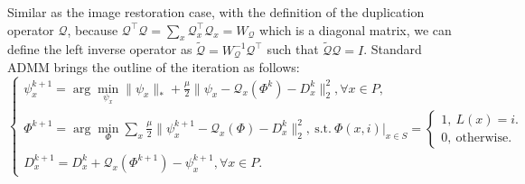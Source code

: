 \documentclass[letterpaper,10pt]{article}
\begin{document}
Similar as the image restoration case, with the definition of the duplication operator $\mathcal{Q}$, because $\mathcal{Q}^{\top}\mathcal{Q} = \sum_{x} \mathcal{Q}_x^{\top}\mathcal{Q}_x = W_{\mathcal{Q}}$ which is a diagonal matrix, we can define the left inverse operator as $\tilde{\mathcal{Q}} = W_{\mathcal{Q}}^{-1} \mathcal{Q}^{\top}$ such that $\tilde{\mathcal{Q}}\mathcal{Q} = I$. Standard ADMM brings the outline of the iteration as follows:
\begin{equation}\label{MINST processing inner iteration scheme}
\begin{cases}
\psi_x^{k+1} = \arg\min_{\psi_x}  \|\psi_x\|_* +\frac{\mu}{2}\|{\psi_x} - \mathcal{Q}_x (\Phi^{k}) -D_{x}^{k}\|_2^2 , \forall x \in P,\\
{\Phi}^{k+1} = \arg\min_\Phi \sum_{x} \frac{\mu}{2}\|{\psi_x^{k+1}} - \mathcal{Q}_x (\Phi) -D_{x}^{k}\|_2^2, ~ \text{s.t.} ~ \Phi(x,i)|_{x \in S} = \begin{cases}1,   \ L(x) = i.\\0, \ \text{otherwise}. \end{cases}\\
D_x^{k+1} = D_x^k + \mathcal{Q}_x (\Phi^{k+1}) - \psi_x^{k+1}, \forall x \in P.
\end{cases}
\end{equation}
\end{document}
